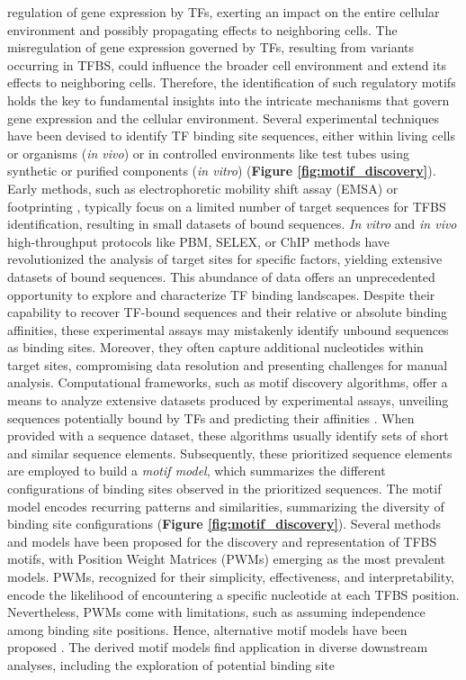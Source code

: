 \documentclass[a4paper, titlepage, openright]{book}
\begin{document}
regulation of gene expression by TFs, exerting an impact on the entire cellular environment and possibly propagating effects to neighboring cells. The misregulation of gene expression governed by TFs, resulting from variants occurring in TFBS, could influence the broader cell environment and extend its effects to neighboring cells. Therefore, the identification of such regulatory motifs holds the key to fundamental insights into the intricate mechanisms that govern gene expression and the cellular environment. Several experimental techniques have been devised to identify TF binding site sequences, either within living cells or organisms (\emph{in vivo}) or in controlled environments like test tubes using synthetic or purified components (\emph{in vitro}) \citep{jolma2011methods} (\textbf{Figure \ref{fig:motif_discovery}}). Early methods, such as electrophoretic mobility shift assay (EMSA) \citep{garner1981gel} or footprinting \citep{hampshire2007footprinting}, typically focus on a limited number of target sequences for TFBS identification, resulting in small datasets of bound sequences. \emph{In vitro} and \emph{in vivo} high-throughput protocols like PBM, SELEX, or ChIP methods \citep{berger2006compact,jolma2010multiplexed,collas2008chop} have revolutionized the analysis of target sites for specific factors, yielding extensive datasets of bound sequences. This abundance of data offers an unprecedented opportunity to explore and characterize TF binding landscapes. Despite their capability to recover TF-bound sequences and their relative or absolute binding affinities, these experimental assays may mistakenly identify unbound sequences as binding sites. Moreover, they often capture additional nucleotides within target sites, compromising data resolution and presenting challenges for manual analysis. Computational frameworks, such as motif discovery algorithms, offer a means to analyze extensive datasets produced by experimental assays, unveiling sequences potentially bound by TFs and predicting their affinities \citep{pavesi2004silico,tompa2005assessing,d2006does,das2007survey,zambelli2013motif,tognon2023survey}. When provided with a sequence dataset, these algorithms usually identify sets of short and similar sequence elements. Subsequently, these prioritized sequence elements are employed to build a \emph{motif model}, which summarizes the different configurations of binding sites observed in the prioritized sequences. The motif model encodes recurring patterns and similarities, summarizing the diversity of binding site configurations (\textbf{Figure \ref{fig:motif_discovery}}). Several methods and models have been proposed for the discovery and representation of TFBS motifs, with Position Weight Matrices (PWMs) \citep{stormo2000dna} emerging as the most prevalent models. PWMs, recognized for their simplicity, effectiveness, and interpretability, encode the likelihood of encountering a specific nucleotide at each TFBS position. Nevertheless, PWMs come with limitations, such as assuming independence among binding site positions. Hence, alternative motif models have been proposed \citep{siddharthan2010dinucleotide,gorkin2012integration,he2021survey}. The derived motif models find application in diverse downstream analyses, including the exploration of potential binding site 
\end{document}
